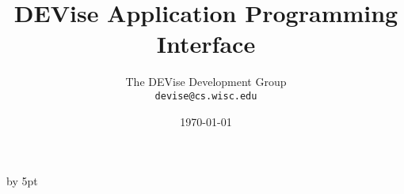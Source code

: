 %



%
%
%
%
%



\renewcommand{\topfraction}{1.0}
\renewcommand{\bottomfraction}{1.0}
\renewcommand{\textfraction}{0.0}
\advance\intextsep by 5pt

\def\filename#1{{\tt #1}}
\def\code#1{{\tt #1}}
\def\menu#1{{\tt #1}}
\def\term#1{#1}
\def\variable#1{{\tt #1}}

\def\scaleepspic[#1]#2#3{
\begin{figure}[htb]
\centering\leavevmode\epsfxsize=#1\epsfbox{#2}
\caption{#3}
\end{figure}
}

\def\fullepspic#1#2{
\begin{figure}[htb]
\centering\leavevmode\epsfxsize=\textwidth\epsfbox{#1}
\caption{#2}
\end{figure}
}


\title{DEVise Application Programming Interface}
\author{The DEVise Development Group \\
\code{devise@cs.wisc.edu}
}
\date{\today}

\maketitle

